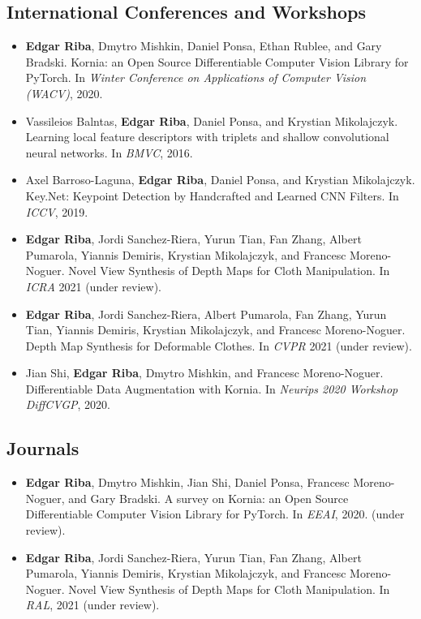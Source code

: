 \subsection{International Conferences and Workshops}
\begin{itemize}
\item \textbf{Edgar Riba}, Dmytro Mishkin, Daniel Ponsa, Ethan Rublee, and Gary Bradski. Kornia: an Open Source Differentiable Computer Vision Library for PyTorch. In \textit{Winter Conference on Applications of Computer Vision (WACV)}, 2020.
\item Vassileios Balntas, \textbf{Edgar Riba}, Daniel Ponsa, and Krystian  Mikolajczyk. Learning local feature descriptors with triplets and shallow convolutional neural networks. In \textit{BMVC}, 2016.
\item Axel Barroso-Laguna, \textbf{Edgar Riba}, Daniel Ponsa, and Krystian Mikolajczyk. Key.Net: Keypoint Detection by Handcrafted and Learned CNN Filters. In \textit{ICCV}, 2019.
\item \textbf{Edgar Riba}, Jordi Sanchez-Riera, Yurun Tian, Fan Zhang, Albert Pumarola, Yiannis Demiris, Krystian Mikolajczyk, and Francesc Moreno-Noguer. Novel View Synthesis of Depth Maps for Cloth Manipulation. In \textit{ICRA} 2021 (under review).
\item \textbf{Edgar Riba}, Jordi Sanchez-Riera, Albert Pumarola, Fan Zhang, Yurun Tian, Yiannis Demiris, Krystian Mikolajczyk, and Francesc Moreno-Noguer. Depth Map Synthesis for Deformable Clothes. In \textit{CVPR} 2021 (under review).
\item Jian Shi, \textbf{Edgar Riba}, Dmytro Mishkin, and Francesc Moreno-Noguer. Differentiable Data Augmentation with Kornia. In \textit{Neurips 2020 Workshop DiffCVGP}, 2020.
\end{itemize}

\subsection{Journals}
\begin{itemize}
\item \textbf{Edgar Riba}, Dmytro Mishkin, Jian Shi, Daniel Ponsa, Francesc Moreno-Noguer, and  Gary Bradski. A survey on Kornia: an Open Source Differentiable Computer Vision Library for PyTorch. In \textit{EEAI}, 2020. (under review).
\item \textbf{Edgar Riba}, Jordi Sanchez-Riera, Yurun Tian, Fan Zhang, Albert Pumarola, Yiannis Demiris, Krystian Mikolajczyk, and Francesc Moreno-Noguer. Novel View Synthesis of Depth Maps for Cloth Manipulation. In \textit{RAL}, 2021 (under review).
\end{itemize}


